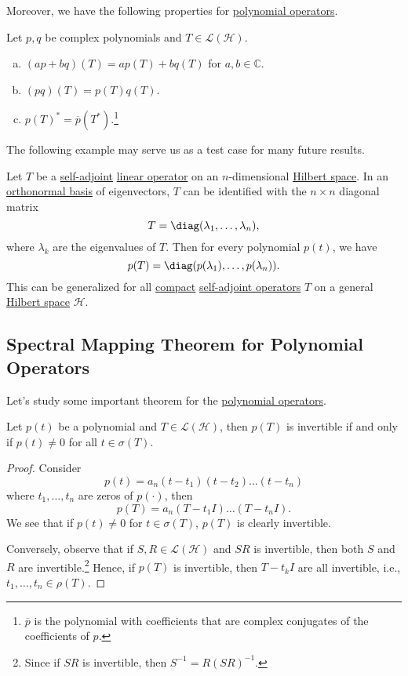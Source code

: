 Moreover, we have the following properties for \hyperref[def:polynomial-op]{polynomial operators}.

\begin{proposition}\label{prop:polynomial-op}
	Let \(p, q\) be complex polynomials and \(T\in \mathcal{L} (\mathcal{H} )\).
	\begin{enumerate}[(a)]
		\item \((ap + bq)(T) = ap(T) + bq(T)\) for \(a, b\in \mathbb{C} \).
		\item \((pq)(T) = p(T) q(T)\).
		\item \(p(T)^{\ast} = \overline{p} (T^{\ast} )\).\footnote{\(\overline{p} \) is the polynomial with coefficients that are complex conjugates of the coefficients of \(p\).}
	\end{enumerate}
\end{proposition}

The following example may serve us as a test case for many future results.

\begin{eg}
	Let \(T\) be a \hyperref[def:self-adjoint-op]{self-adjoint} \hyperref[def:linear-op]{linear operator} on an \(n\)-dimensional \hyperref[def:Hilbert-space]{Hilbert space}. In an \hyperref[def:orthonormal-basis]{orthonormal basis} of eigenvectors, \(T\) can be identified with the \(n \times n\) diagonal matrix
	\[
		T = \diag (\lambda _1, \ldots , \lambda _n),
	\]
	where \(\lambda _k\) are the eigenvalues of \(T\). Then for every polynomial \(p(t)\), we have
	\[
		p(T) = \diag (p(\lambda _1), \ldots  , p(\lambda _n)).
	\]
	This can be generalized for all \hyperref[def:compact-op]{compact} \hyperref[def:self-adjoint-op]{self-adjoint operators} \(T\) on a general \hyperref[def:Hilbert-space]{Hilbert space} \(\mathcal{H} \).
\end{eg}

\subsection{Spectral Mapping Theorem for Polynomial Operators}
Let's study some important theorem for the \hyperref[def:polynomial-op]{polynomial operators}.

\begin{lemma}\label{lma:invertibility-for-polynomial-op}
	Let \(p(t)\) be a polynomial and \(T\in \mathcal{L} (\mathcal{H} )\), then \(p(T)\) is invertible if and only if \(p(t) \neq 0\) for all \(t\in \sigma (T)\).
\end{lemma}
\begin{proof}
	Consider
	\[
		p(t) = a_n (t-t_1)(t-t_2)\ldots  (t-t_n)
	\]
	where \(t_1, \ldots  , t_n\) are zeros of \(p(\cdot)\), then
	\[
		p(T) = a_n (T-t_1 I)\ldots  (T-t_n I).
	\]
	We see that if \(p(t) \neq 0\) for \(t\in \sigma (T)\), \(p(T)\) is clearly invertible.

	Conversely, observe that if \(S, R\in \mathcal{L} (\mathcal{H} )\) and \(SR\) is invertible, then both \(S\) and \(R\) are invertible.\footnote{Since if \(SR\) is invertible, then \(S^{-1} = R(SR)^{-1} \).} Hence, if \(p(T)\) is invertible, then \(T - t_k I\) are all invertible, i.e., \(t_1, \ldots  , t_n\in \rho (T)\).
\end{proof}

